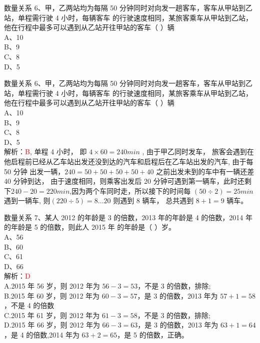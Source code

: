\documentclass[aspectratio=169]{beamer}
\begin{document}
\begin{frame}[t]{数量关系}
    6、甲，乙两站均为每隔 50 分钟同时对向发一趟客车，客车从甲站到乙站，单程需行驶 4 小时，每辆客车
    的行驶速度相同，某旅客乘车从甲站到乙站，他在行程中最多可以遇到从乙站开往甲站的客车（ ）辆\\
    A、10\\
    B、9\\
    C、8\\
    D、5\\
\end{frame}


\begin{frame}[t]{数量关系}
    6、甲，乙两站均为每隔 50 分钟同时对向发一趟客车，客车从甲站到乙站，单程需行驶 4 小时，每辆客车
    的行驶速度相同，某旅客乘车从甲站到乙站，他在行程中最多可以遇到从乙站开往甲站的客车（ ）辆\\
    A、10\\
    B、9\\
    C、8\\
    D、5\\
    解析：\textcolor{red}{B},
    单程 4 小时， 即 $4 \times 60 = 240min$ ,
    由于甲乙同时发车， 旅客会遇到在他启程前已经从乙车站出发还没到达的汽车和启程后在乙车站出发的汽车,
    由于每 50 分钟 出发一辆，$240=50+50+50+50+40$ 之前出发未到的车中有一辆还差 40 分钟到达，
    由于速度相同，则乘客出发后 20 分钟可遇到第一辆车，此时还剩下$240-20=220 min$,因为两个车同时走，所以接下的时间每 $(50 \div 2) = 25 min$ 遇到一辆车,
    则$(220 \div 5 ) = 8...20$ 则遇到 8 辆车， 总共遇到 $8+1=9$ 辆车。

\end{frame}



\begin{frame}[t]{数量关系}
    7、某人 2012 的年龄是 3 的倍数，2013 年的年龄是 4 的倍数，2014 年的年龄是 5 的倍数，则此人 2015 年
    的年龄是（ ）岁。\\
    A、56\\
    B、60\\
    C、61\\
    D、66\\
    解析：\textcolor{red}{D}\\
    A.2015 年 56 岁，则 2012 年为 $56-3 = 53$，不是 3 的倍数，排除;\\
    B.2015 年 60 岁，则 2012 年为 $60-3 = 57$，是 3 的倍数，2013 年为 $57+1 = 58$，不是 4 的倍数\\
    C.2015 年 61 岁，则 2012 年为 $61-3 = 58$，不是 3 的倍数，排除;\\
    D.2015 年 66 岁，则 2012 年为 $66-3 = 63$，是 3 的倍数，2013 年为 $63+1 = 64$，是 4 的倍数,2014
    年为 $63+2 = 65$，是 5 的倍数，正确。\\
\end{frame}
\end{document}
